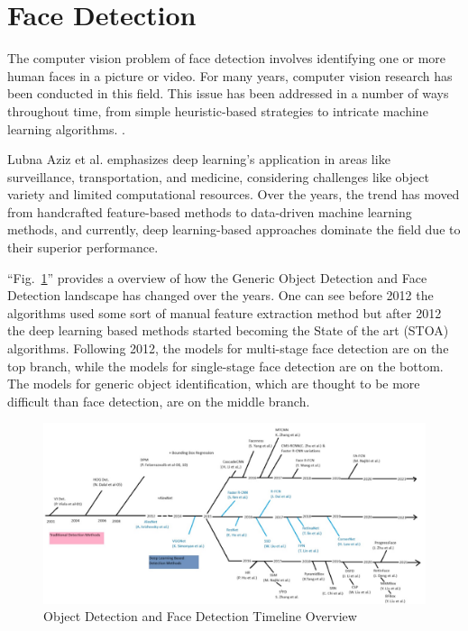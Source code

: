 \section{Face Detection} \label{section:fd}
The computer vision problem of face detection involves identifying one or more human faces in a picture or video. For many years, computer vision research has been conducted in this field. This issue has been addressed in a number of ways throughout time, from simple heuristic-based strategies to intricate machine learning algorithms. \cite{feng_detect_2022}.

Lubna Aziz et al. \cite{aziz_exploring_2020} emphasizes deep learning's application in areas like surveillance, transportation, and medicine, considering challenges like object variety and limited computational resources. Over the years, the trend has moved from handcrafted feature-based methods to data-driven machine learning methods, and currently, deep learning-based approaches dominate the field due to their superior performance.

``Fig.~\ref{od-timeline}'' provides a overview of how the Generic Object Detection and Face Detection landscape has changed over the years. One can see before 2012 the algorithms used some sort of manual feature extraction method but after 2012 the deep learning based methods started becoming the State of the art (STOA) algorithms. Following 2012, the models for multi-stage face detection are on the top branch, while the models for single-stage face detection are on the bottom. The models for generic object identification, which are thought to be more difficult than face detection, are on the middle branch.

\begin{figure}[htbp]
\centerline{\includegraphics[width=\columnwidth]{components/images/od-timeline.jpg}}
\caption{Object Detection and Face Detection Timeline Overview}
\label{od-timeline}
\end{figure}

